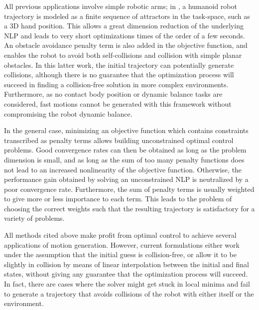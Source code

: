 All previous applications involve simple robotic arms; in
\cite{Toussaint2007}, a humanoid robot trajectory is modeled as a
finite sequence of attractors in the task-space, such as a 3D hand
position. This allows a great dimension reduction of the underlying
NLP and leads to very short optimizations times of the order of a few
seconds. An obstacle avoidance penalty term is also added in the
objective function, and enables the robot to avoid both
self-collisions and collision with simple planar obstacles. In this
latter work, the initial trajectory can potentially generate
collisions, although there is no guarantee that the optimization
process will succeed in finding a collision-free solution in more
complex environments. Furthermore, as no contact body position or
dynamic balance tasks are considered, fast motions cannot be generated
with this framework without compromising the robot dynamic balance.

In the general case, minimizing an objective function which contains
constraints transcribed as penalty terms allows building unconstrained
optimal control problems. Good convergence rates can then be obtained
as long as the problem dimension is small, and as long as the sum of
too many penalty functions does not lead to an increased nonlinearity
of the objective function. Otherwise, the performance gain obtained by
solving an unconstrained NLP is neutralized by a poor convergence
rate. Furthermore, the sum of penalty terms is usually weighted to
give more or less importance to each term. This leads to the problem
of choosing the correct weights such that the resulting trajectory is
satisfactory for a variety of problems.

\bigskip

All methods cited above make profit from optimal control to achieve
several applications of motion generation. However, current
formulations either work under the assumption that the initial guess
is collision-free, or allow it to be slightly in collision by means of
linear interpolation between the initial and final states, without
giving any guarantee that the optimization process will succeed. In
fact, there are cases where the solver might get stuck in local minima
and fail to generate a trajectory that avoids collisions of the robot
with either itself or the environment.

\bigskip

